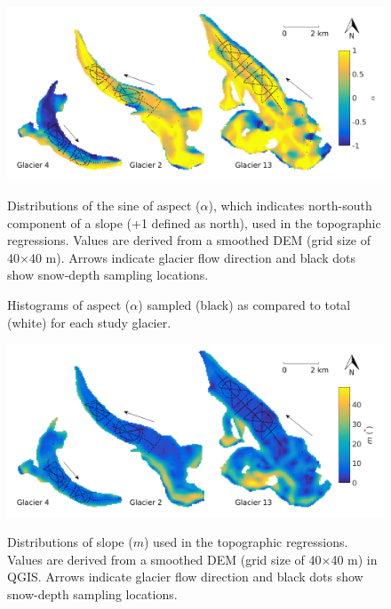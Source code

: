 \documentclass{sfuthesis}
\newcommand{\topomap}{Arrows indicate glacier flow direction and black dots show snow-depth sampling locations. }
\begin{document}
\begin{figure}[H]
	\centering
	\includegraphics[width=\textwidth]{Map_aspect.png}\\
	\caption[Distributions of the sine of aspect ($\alpha$)]{Distributions of the sine of aspect ($\alpha$), which indicates north-south component of a slope (+1 defined as north), used in the topographic regressions. Values are derived from a smoothed DEM (grid size of 40$\times$40 m). \topomap}
	\label{map:aspect}
\end{figure}

\begin{figure}[H]
	\caption[Histograms of full and sampled aspect ($\alpha$)]{Histograms of aspect ($\alpha$) sampled (black) as compared to total (white) for each study glacier.}
	\label{sampledRange:aspect}
\end{figure}

\begin{figure}[H]
	\centering
	\includegraphics[width=\textwidth]{Map_slope.png}\\
	\caption[Distributions of slope ($m$)]{Distributions of slope ($m$) used in the topographic regressions. Values are derived from a smoothed DEM (grid size of 40$\times$40 m) in QGIS. \topomap}
	\label{map:slope}
\end{figure}
\end{document}
